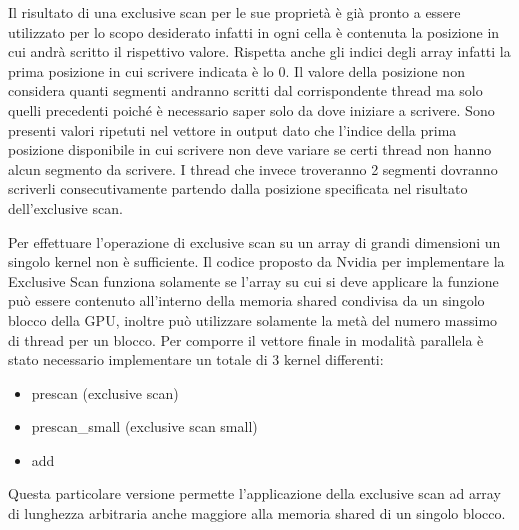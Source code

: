 \documentclass[12pt,a4paper]{report}
\begin{document}
\begin{figure}[H]
\centering
\begin{floatrow}[1]
\end{floatrow}
\end{figure} 
Il risultato di una exclusive scan per le sue proprietà è già pronto a essere utilizzato per lo scopo desiderato infatti in ogni cella è contenuta la posizione in cui andrà scritto il rispettivo valore. Rispetta anche gli indici degli array infatti la prima posizione in cui scrivere indicata è lo 0. Il valore della posizione non considera quanti segmenti andranno scritti dal corrispondente thread ma solo quelli precedenti poiché è necessario saper solo da dove iniziare a scrivere. \newline
Sono presenti valori ripetuti nel vettore in output dato che l'indice della prima posizione disponibile in cui scrivere non deve variare se certi thread non hanno alcun segmento da scrivere. I thread che invece troveranno 2 segmenti dovranno scriverli consecutivamente partendo dalla posizione specificata nel risultato dell'exclusive scan. \newpage

Per effettuare l'operazione di exclusive scan su un array di grandi dimensioni un singolo kernel non è sufficiente.
Il codice proposto da Nvidia per implementare la Exclusive Scan funziona solamente se l’array su cui si deve applicare la funzione può essere contenuto all’interno della memoria shared condivisa da un singolo blocco della GPU, inoltre può utilizzare solamente la metà del numero massimo di thread per un blocco. \newline
Per comporre il vettore finale in modalità parallela è stato necessario implementare un totale di 3 kernel differenti:
\begin{itemize}
    \item prescan (exclusive scan)
    \item prescan\_small  (exclusive scan small)
    \item add
\end{itemize}
Questa particolare versione permette l'applicazione della exclusive scan ad array di lunghezza arbitraria anche maggiore alla memoria shared di un singolo blocco. \newline
\end{document}
